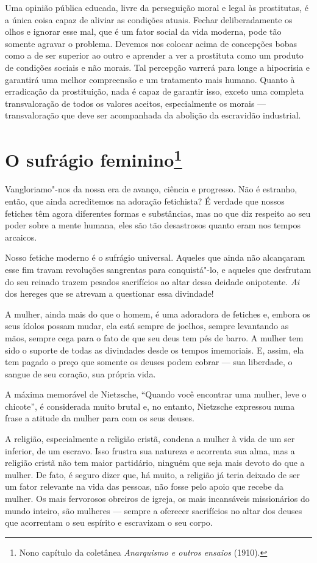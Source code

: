 Uma opinião pública educada, livre da perseguição moral e legal às
prostitutas, é a única coisa capaz de aliviar as condições atuais.
Fechar deliberadamente os olhos e ignorar esse mal, que é um fator
social da vida moderna, pode tão somente agravar o problema. Devemos nos
colocar acima de concepções bobas como a de ser superior ao outro e
aprender a ver a prostituta como um produto de condições sociais e não
morais. Tal percepção varrerá para longe a hipocrisia e garantirá uma
melhor compreensão e um tratamento mais humano. Quanto à erradicação da
prostituição, nada é capaz de garantir isso, exceto uma completa
transvaloração de todos os valores aceitos, especialmente os morais --- transvaloração que deve ser acompanhada da abolição da escravidão
industrial.

\chapter{O sufrágio feminino\footnote{Nono capítulo da coletânea \emph{Anarquismo
  e outros ensaios} (1910).}}

Vangloriamo"-nos da nossa era de avanço, ciência e progresso. Não é
estranho, então, que ainda acreditemos na adoração fetichista? É verdade
que nossos fetiches têm agora diferentes formas e substâncias, mas no
que diz respeito ao seu poder sobre a mente humana, eles são tão
desastrosos quanto eram nos tempos arcaicos.

Nosso fetiche moderno é o sufrágio universal. Aqueles que ainda não
alcançaram esse fim travam revoluções sangrentas para conquistá"-lo, e
aqueles que desfrutam do seu reinado trazem pesados ​​sacrifícios ao
altar dessa deidade onipotente. \textit{Ai} dos hereges que se atrevam a
questionar essa divindade!

A mulher, ainda mais do que o homem, é uma adoradora de fetiches e,
embora os seus ídolos possam mudar, ela está sempre de joelhos, sempre
levantando as mãos, sempre cega para o fato de que seu deus tem pés de
barro. A mulher tem sido o suporte de todas as divindades desde os tempos
imemoriais. E, assim, ela tem pagado o preço que somente os deuses podem
cobrar --- sua liberdade, o sangue de seu coração, sua própria vida.

A máxima memorável de Nietzsche, ``Quando você encontrar uma mulher,
leve o chicote'', é considerada muito brutal e, no entanto, Nietzsche
expressou numa frase a atitude da mulher para com os seus deuses.

A religião, especialmente a religião cristã, condena a mulher à vida de
um ser inferior, de um escravo. Isso frustra sua natureza e
acorrenta sua alma, mas a religião cristã não tem maior partidário,
ninguém que seja mais devoto do que a mulher. De fato, é seguro dizer
que, há muito, a religião já teria deixado de ser um fator relevante na vida das
pessoas, não fosse pelo apoio que recebe da mulher. Os mais fervorosos
obreiros de igreja, os mais incansáveis missionários ​​do mundo inteiro,
são mulheres --- sempre a oferecer sacrifícios no altar dos deuses que
acorrentam o seu espírito e escravizam o seu corpo.

